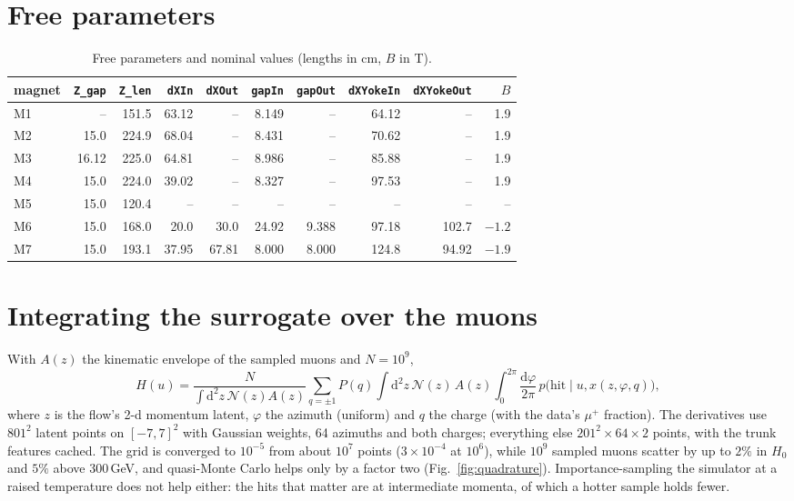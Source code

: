 \documentclass[11pt,a4paper]{article}
\begin{document}
\section{Free parameters}
\begin{table}[h]
\centering
\caption{Free parameters and nominal values (lengths in cm, $B$ in T).}
\label{tab:params}
\small
\begin{tabular}{lrrrrrrrrr}
\toprule
magnet & \texttt{Z\_gap} & \texttt{Z\_len} & \texttt{dXIn} & \texttt{dXOut} & \texttt{gapIn} & \texttt{gapOut} & \texttt{dXYokeIn} & \texttt{dXYokeOut} & $B$ \\
\midrule
M1 &  --   & 151.5 & 63.12 & --    & 8.149 & --    & 64.12 & --     & 1.9 \\
M2 & 15.0  & 224.9 & 68.04 & --    & 8.431 & --    & 70.62 & --     & 1.9 \\
M3 & 16.12 & 225.0 & 64.81 & --    & 8.986 & --    & 85.88 & --     & 1.9 \\
M4 & 15.0  & 224.0 & 39.02 & --    & 8.327 & --    & 97.53 & --     & 1.9 \\
M5 & 15.0  & 120.4 & --    & --    & --    & --    & --    & --     & -- \\
M6 & 15.0  & 168.0 & 20.0  & 30.0  & 24.92 & 9.388 & 97.18 & 102.7  & $-1.2$ \\
M7 & 15.0  & 193.1 & 37.95 & 67.81 & 8.000 & 8.000 & 124.8 & 94.92  & $-1.9$ \\
\bottomrule
\end{tabular}
\end{table}

\section{Integrating the surrogate over the muons}
\label{app:quadrature}

With $A(z)$ the kinematic envelope of the sampled muons and $N=10^9$,
\begin{equation}
  H(u) = \frac{N}{\int\!\mathrm{d}^2z\,\mathcal{N}(z)A(z)}\sum_{q=\pm1}P(q)\int\!\mathrm{d}^2z\,
  \mathcal{N}(z)\,A(z)\int_0^{2\pi}\!\frac{\mathrm{d}\varphi}{2\pi}\,p\big(\text{hit}\mid u, x(z,\varphi,q)\big),
\end{equation}
where $z$ is the flow's 2-d momentum latent, $\varphi$ the azimuth (uniform) and $q$ the charge
(with the data's $\mu^+$ fraction). The derivatives use $801^2$ latent points on $[-7,7]^2$ with
Gaussian weights, 64 azimuths and both charges; everything else $201^2\times64\times2$ points, with
the trunk features cached. The grid is converged to $10^{-5}$ from about $10^7$ points ($3\times10^{-4}$ at $10^6$), while
$10^9$ sampled muons scatter by up to $2\%$ in $H_0$ and $5\%$ above $300$\,GeV, and quasi-Monte
Carlo helps only by a factor two (Fig.~\ref{fig:quadrature}). Importance-sampling the simulator
at a raised temperature does not help either: the hits that matter are at intermediate momenta,
of which a hotter sample holds fewer.
\end{document}
